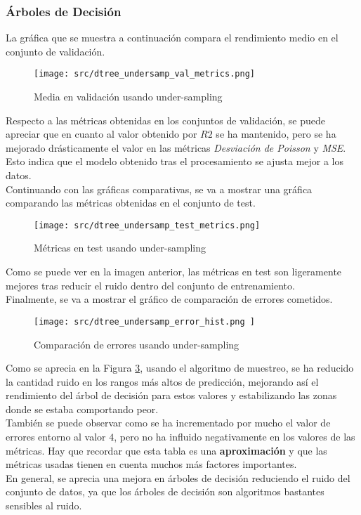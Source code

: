 \subsubsection*{Árboles de Decisión}
La gráfica que se muestra a continuación compara el rendimiento medio en el conjunto de validación.
\begin{figure}[H]
	\centering
	\texttt{[image: src/dtree\_undersamp\_val\_metrics.png]}
	\caption{Media en validación usando under-sampling}
	\label{fig:cmp_val_dtree}
\end{figure}
Respecto a las métricas obtenidas en los conjuntos de validación, se puede apreciar que en cuanto al valor obtenido por $R2$ se ha mantenido, pero se ha mejorado drásticamente el valor en las métricas \textit{Desviación de Poisson} y \textit{MSE}. Esto indica que el modelo obtenido tras el procesamiento se ajusta mejor a los datos.\\
\linebreak
Continuando con las gráficas comparativas, se va a mostrar una gráfica comparando las métricas obtenidas en el conjunto de test.
\begin{figure}[H]
	\centering
	\texttt{[image: src/dtree\_undersamp\_test\_metrics.png]}
	\caption{Métricas en test usando under-sampling}
	\label{fig:cmp_test_dtree}
\end{figure}
Como se puede ver en la imagen anterior, las métricas en test son ligeramente mejores tras reducir el ruido dentro del conjunto de entrenamiento.\\
\linebreak
\clearpage
Finalmente, se va a mostrar el gráfico de comparación de errores cometidos.
\begin{figure}[H]
	\centering
	\texttt{[image: src/dtree\_undersamp\_error\_hist.png ]}
	\caption{Comparación de errores usando under-sampling}
	\label{fig:cmp_error_dtree}
\end{figure}
Como se aprecia en la Figura \ref{fig:cmp_error_dtree}, usando el algoritmo de muestreo, se ha reducido la cantidad ruido en los rangos más altos de predicción, mejorando así el rendimiento del árbol de decisión para estos valores y estabilizando las zonas donde se estaba comportando peor.\\
\linebreak
También se puede observar como se ha incrementado por mucho el valor de errores entorno al valor $4$, pero no ha influido negativamente en los valores de las métricas. Hay que recordar que esta tabla es una \textbf{aproximación} y que las métricas usadas tienen en cuenta muchos más factores importantes.\\
\linebreak
En general, se aprecia una mejora en árboles de decisión reduciendo el ruido del conjunto de datos, ya que los árboles de decisión son algoritmos bastantes sensibles al ruido.
\clearpage
